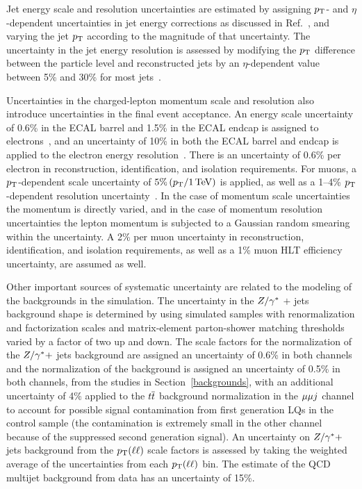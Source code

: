 Jet energy scale and resolution uncertainties are estimated by assigning $p_{\mathrm{T}}$- and $\eta$-dependent uncertainties in jet energy corrections as discussed in Ref.~\cite{CMS-PAPERS-JME-10-011}, and varying the jet $p_{\mathrm{T}}$ according to the magnitude of that uncertainty.  The uncertainty in the jet energy resolution is assessed by modifying the $p_{\mathrm{T}}$ difference between the particle level and reconstructed jets by an $\eta$-dependent value between 5\% and 30\% for most jets~\cite{CMS-PAPERS-JME-10-011}.  

Uncertainties in the charged-lepton momentum scale and resolution also introduce uncertainties in the final event acceptance.  An energy scale uncertainty of 0.6\% in the ECAL barrel and 1.5\% in the ECAL endcap is assigned to electrons~\cite{EleUncertainties}, and an uncertainty of 10\% in both the ECAL barrel and endcap is applied to the electron energy resolution~\cite{EleUncertainties}.  There is an uncertainty of 0.6\% per electron in reconstruction, identification, and isolation requirements.  For muons, a $p_{\mathrm{T}}$-dependent scale uncertainty of  $5\% \, (p_{\mathrm{T}}/1 \,\text{Te\hspace{-.08em}V})$ is applied, as well as a 1--4\% $p_{\mathrm{T}}$-dependent resolution uncertainty~\cite{Chatrchyan:2012xi}.  In the case of momentum scale uncertainties the momentum is directly varied, and in the case of momentum resolution uncertainties the lepton momentum is subjected to a Gaussian random smearing within the uncertainty.  A 2\% per muon uncertainty in reconstruction, identification, and isolation requirements, as well as a 1\% muon HLT efficiency uncertainty, are assumed as well.

Other important sources of systematic uncertainty are related to the modeling of the backgrounds in the simulation.  The uncertainty in the $\relax{Z}/\gamma^{*}$ $+$ jets background shape  is determined by using simulated samples with renormalization and factorization scales and matrix-element parton-shower matching thresholds varied by a factor of two up and down.  The scale factors for the normalization of the $\relax{Z}/\gamma^{*}+$ jets background are assigned an uncertainty of 0.6\% in both channels and the normalization of the \ttbar background is assigned an uncertainty of 0.5\% in both channels, from the studies in Section~\ref{backgrounds}, with an additional uncertainty of 4\% applied to the $\relax{t}\overline{\relax{t}}$ background normalization in the ${\mu} {\mu} j$ channel to account for possible signal contamination from first generation LQs in the control sample (the contamination is extremely small in the other channel because of the suppressed second generation signal).  An uncertainty on $\relax{Z}/\gamma^{*}+$ jets background from the $p_{\mathrm{T}}(\ell\ell)$ scale factors is assessed by taking the weighted average of the uncertainties from each $p_{\mathrm{T}}(\ell\ell)$ bin.  The estimate of the QCD multijet background from data has an uncertainty of 15\%.


